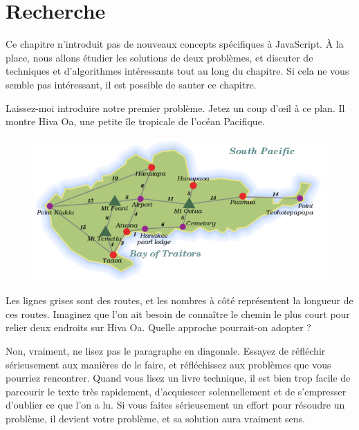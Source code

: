 \documentclass{FramateX}
\begin{document}
\chapter{Recherche}

Ce chapitre n'introduit pas de nouveaux concepts spécifiques à
JavaScript. À la place, nous allons étudier les solutions de deux
problèmes, et discuter de techniques et d'algorithmes intéressants tout
au long du chapitre. Si cela ne vous semble pas intéressant, il est
possible de sauter ce chapitre.

\begin{center}\end{center}

Laissez-moi introduire notre premier problème. Jetez un coup d'œil à ce
plan. Il montre Hiva Oa, une petite île tropicale de l'océan Pacifique.

\begin{figure}[htbp]
\centering
\includegraphics{img/Hiva Oa.png}
\caption{}
\end{figure}

Les lignes grises sont des routes, et les nombres à côté représentent la
longueur de ces routes. Imaginez que l'on ait besoin de connaître le
chemin le plus court pour relier deux endroits sur Hiva Oa. Quelle
approche pourrait-on adopter ?

Non, vraiment, ne lisez pas le paragraphe en diagonale. Essayez de
réfléchir sérieusement aux manières de le faire, et réfléchissez aux
problèmes que vous pourriez rencontrer. Quand vous lisez un livre
technique, il est bien trop facile de parcourir le texte très
rapidement, d'acquiescer solennellement et de s'empresser d'oublier ce
que l'on a lu. Si vous faites sérieusement un effort pour résoudre un
problème, il devient votre problème, et sa solution aura vraiment sens.

\begin{center}\end{center}
\end{document}
